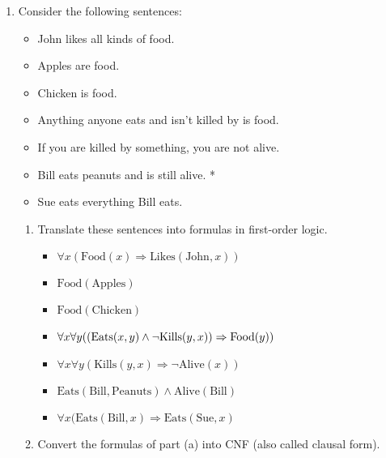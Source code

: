 \documentclass[12pt]{article}
\begin{document}
\begin{enumerate}
	\item Consider the following sentences:

		\begin{itemize}
			\item John likes all kinds of food.
			\item Apples are food.
			\item Chicken is food.
			\item Anything anyone eats and isn't killed by is food.
			\item If you are killed by something, you are not alive.
			\item Bill eats peanuts and is still alive. *
			\item Sue eats everything Bill eats.
		\end{itemize}

		\begin{enumerate}
			\item Translate these sentences into formulas in first-order logic.

			\begin{itemize}
				\item $\forall x (\text{Food}(x) \Rightarrow \text{Likes}(\text{John}, x))$
				\item $\text{Food}(\text{Apples})$
				\item $\text{Food}(\text{Chicken})$
				\item $\forall x \forall y ((\text{Eats}(x, y) \land \neg \text{\text{Kills}}(y, x)) \Rightarrow \text{Food}(y))$
				\item $\forall x \forall y (\text{Kills}(y, x) \Rightarrow \neg \text{Alive}(x))$
				\item $\text{Eats}(\text{Bill}, \text{Peanuts}) \land \text{Alive}(\text{Bill})$
				\item $\forall x (\text{Eats}(\text{Bill}, x) \Rightarrow \text{Eats}(\text{Sue}, x)$
			\end{itemize}

			\item Convert the formulas of part (a) into CNF (also called clausal form).


\end{enumerate}
\end{enumerate}
\end{document}
